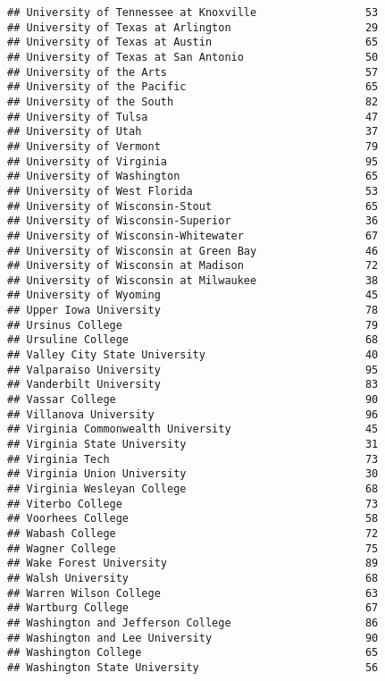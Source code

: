 \documentclass[
]{article}
\begin{document}
\begin{verbatim}
## University of Tennessee at Knoxville                 53
## University of Texas at Arlington                     29
## University of Texas at Austin                        65
## University of Texas at San Antonio                   50
## University of the Arts                               57
## University of the Pacific                            65
## University of the South                              82
## University of Tulsa                                  47
## University of Utah                                   37
## University of Vermont                                79
## University of Virginia                               95
## University of Washington                             65
## University of West Florida                           53
## University of Wisconsin-Stout                        65
## University of Wisconsin-Superior                     36
## University of Wisconsin-Whitewater                   67
## University of Wisconsin at Green Bay                 46
## University of Wisconsin at Madison                   72
## University of Wisconsin at Milwaukee                 38
## University of Wyoming                                45
## Upper Iowa University                                78
## Ursinus College                                      79
## Ursuline College                                     68
## Valley City State University                         40
## Valparaiso University                                95
## Vanderbilt University                                83
## Vassar College                                       90
## Villanova University                                 96
## Virginia Commonwealth University                     45
## Virginia State University                            31
## Virginia Tech                                        73
## Virginia Union University                            30
## Virginia Wesleyan College                            68
## Viterbo College                                      73
## Voorhees College                                     58
## Wabash College                                       72
## Wagner College                                       75
## Wake Forest University                               89
## Walsh University                                     68
## Warren Wilson College                                63
## Wartburg College                                     67
## Washington and Jefferson College                     86
## Washington and Lee University                        90
## Washington College                                   65
## Washington State University                          56

\end{verbatim}
\end{document}
